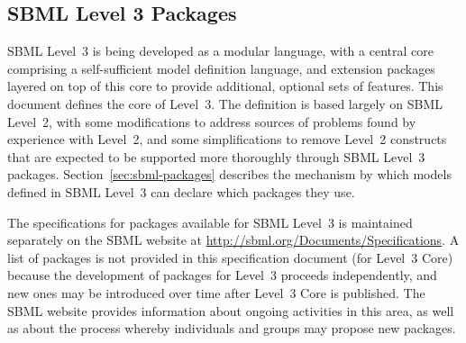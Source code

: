 \subsection{SBML Level 3 Packages}
\label{sec:packages}

SBML Level~3 is being developed as a modular language, with a
central core comprising a self-sufficient model definition
language, and extension packages layered on top of this core to
provide additional, optional sets of features.  This document
defines the core of Level~3.  The definition is based largely on
SBML Level~2, with some modifications to address sources of
problems found by experience with Level~2, and some
simplifications to remove Level~2 constructs that are expected to
be supported more thoroughly through SBML Level~3 packages.
Section~\ref{sec:sbml-packages} describes the mechanism by which
models defined in SBML Level~3 can declare which packages they
use.  

The specifications for packages available for SBML Level~3 is
maintained separately on the SBML website at
\url{http://sbml.org/Documents/Specifications}.  A list of
packages is not provided in this specification document (\ie for
Level~3 Core) because the development of packages for Level~3
proceeds independently, and new ones may be introduced over time
after Level~3 Core is published.  The SBML website provides
information about ongoing activities in this area, as well as
about the process whereby individuals and groups may propose new
packages.




  
